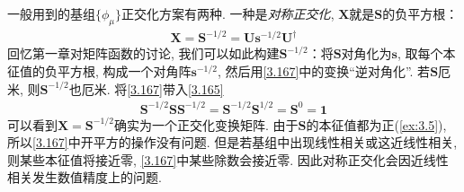 一般用到的基组$\{\phi_\mu\}$正交化方案有两种. 一种是\emph{对称正交化}, $\mathbf{X}$就是$\mathbf{S}$的负平方根：
\begin{align}\label{3.167}
	\mathbf{X} = \mathbf{S}^{-1/2} = \mathbf{U}\mathbf{s}^{-1/2}\mathbf{U}^\dagger
\end{align}
回忆第一章对矩阵函数的讨论, 
我们可以如此构建$\mathbf{S}^{-1/2}$：将$\mathbf{S}$对角化为$\mathbf{s}$, 
取每个本征值的负平方根, 
构成一个对角阵$\mathbf{s}^{-1/2}$, 
然后用\autoref{3.167}中的变换``逆对角化”. 
若$\mathbf{S}$厄米, 
则$\mathbf{S}^{-1/2}$也厄米. 
将\autoref{3.167}带入\autoref{3.165}
\begin{align}
	\mathbf{S}^{-1/2}\mathbf{SS}^{-1/2} = \mathbf{S}^{-1/2}\mathbf{S}^{1/2} = \mathbf{S}^0 = \mathbf{1}
\end{align} 
可以看到$\mathbf{X=S}^{-1/2}$确实为一个正交化变换矩阵. 
由于$\mathbf{S}$的本征值都为正(\autoref{ex:3.5}), 
所以\autoref{3.167}中开平方的操作没有问题. 
但是若基组中出现线性相关或这近线性相关, 
则某些本征值将接近零, 
\autoref{3.167}中某些除数会接近零. 
因此对称正交化会因近线性相关发生数值精度上的问题.


